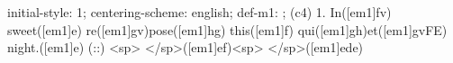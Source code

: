 initial-style: 1;
centering-scheme: english;
def-m1: \grealign;
(c4) 1. In([em1]fv) sweet([em1]e) re([em1]gv)pose([em1]hg) this([em1]f) qui([em1]gh)et([em1]gvFE) night.([em1]e) (::) <sp> </sp>([em1]ef)<sp> </sp>([em1]ede)
